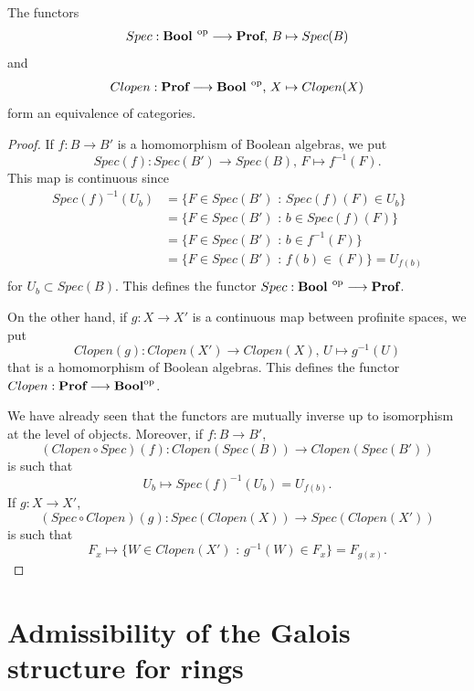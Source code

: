 \begin{theorem}
    The functors
    \[ Spec:{\textbf{Bool }}^{\mathrm{op}}\longrightarrow\textbf{Prof}\text{, }B\mapsto Spec(B) \]
    and
    \[ Clopen:\textbf{Prof}\longrightarrow{\textbf{Bool }}^{\mathrm{op}}\text{, }X\mapsto Clopen(X)  \]
    form an equivalence of categories.
    \begin{proof}
        If $f:B\to B'$ is a homomorphism of Boolean algebras, we put
        \[ Spec(f):Spec(B')\longrightarrow Spec(B)\text{, }F\longmapsto f^{-1}(F). \]
        This map is continuous since
        \begin{align*}
            Spec(f)^{-1}(U_b) &= \{ F\in Spec(B')\text{ : } Spec(f)(F)\in U_b \}\\
            &= \{ F\in Spec(B')\text{ : } b\in Spec(f)(F) \}\\
            &= \{ F\in Spec(B')\text{ : } b\in f^{-1}(F) \}\\
            & = \{ F\in Spec(B')\text{ : } f(b)\in (F) \} = U_{f(b)}\\
        \end{align*}
        for $U_b\subset Spec(B)$. This defines the functor $Spec:{\textbf{Bool }}^{\mathrm{op}}\longrightarrow\textbf{Prof}$.

        On the other hand, if $g:X\to X'$ is a continuous map between profinite spaces, we put
        \[ Clopen(g):Clopen(X')\longrightarrow Clopen(X)\text{, }U\longmapsto g^{-1}(U) \]
        that is a homomorphism of Boolean algebras. This defines the functor $Clopen:\textbf{Prof}\longrightarrow{\textbf{Bool}}^{\mathrm{op}}$.

        We have already seen that the functors are mutually inverse up to isomorphism at the level of objects. Moreover, if $f:B\to B'$,
        \[ (Clopen\circ Spec)(f):Clopen(Spec(B))\longrightarrow Clopen(Spec(B')) \]
        is such that
        \[ U_b \longmapsto Spec(f)^{-1}(U_b) = U_{f(b)}. \]
        If $g:X\to X'$,
        \[ (Spec\circ Clopen)(g):Spec(Clopen(X))\longrightarrow Spec(Clopen(X')) \]
        is such that
        \[ F_x\longmapsto \{W\in Clopen(X')\text{ : }g^{-1}(W)\in F_x\} = F_{g(x)}. \]
    \end{proof}
\end{theorem}

\section{Admissibility of the Galois structure for rings}
\label{sec:AppendixRing}


